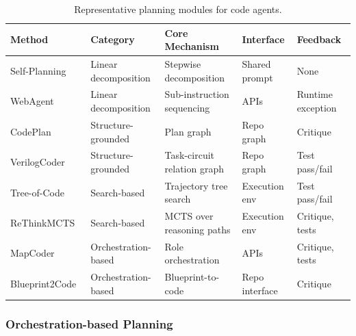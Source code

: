 \documentclass{llmxive}
\providecommand{\arraystretch}{1.15}
\begin{document}
\begin{table}[t]
\centering
\renewcommand{\arraystretch}{1.12}
\setlength{\tabcolsep}{3pt}
\footnotesize
\begin{tabularx}{\textwidth}{@{}llllX@{}}
\toprule
\textbf{Method} & \textbf{Category} & \textbf{Core Mechanism} & \textbf{Interface} & \textbf{Feedback} \\
\midrule
Self-Planning~\cite{jiang2024selfplanning}
& Linear decomposition
& Stepwise decomposition
& Shared prompt
& None \\
WebAgent~\cite{gur2023webagent}
& Linear decomposition
& Sub-instruction sequencing
& APIs
& Runtime exception \\
CodePlan~\cite{bairi2024codeplan}
& Structure-grounded
& Plan graph
& Repo graph
& Critique \\
VerilogCoder~\cite{ho2025verilogcoder}
& Structure-grounded
& Task-circuit relation graph
& Repo graph
& Test pass/fail \\
Tree-of-Code~\cite{ni2024treeofcode}
& Search-based
& Trajectory tree search
& Execution env
& Test pass/fail \\
ReThinkMCTS~\cite{li2025rethinkmcts}
& Search-based
& MCTS over reasoning paths
& Execution env
& Critique, tests \\
MapCoder~\cite{islam2024mapcoder}
& Orchestration-based
& Role orchestration
& APIs
& Critique, tests \\
Blueprint2Code~\cite{mao2025blueprint2code}
& Orchestration-based
& Blueprint-to-code
& Repo interface
& Critique \\
\bottomrule
\end{tabularx}
\caption{Representative planning modules for code agents.}
\label{tab:planning_modules}
\end{table}



\subsubsection{Orchestration-based Planning}
\end{document}
